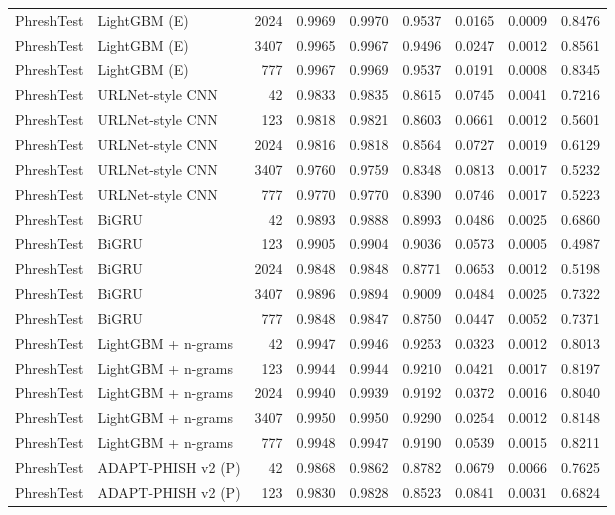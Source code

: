 \begin{table}[t]
\begin{tabular}{llrrrrrrr}
PhreshTest & LightGBM (E) & 2024 & 0.9969 & 0.9970 & 0.9537 & 0.0165 & 0.0009 & 0.8476 \\
PhreshTest & LightGBM (E) & 3407 & 0.9965 & 0.9967 & 0.9496 & 0.0247 & 0.0012 & 0.8561 \\
PhreshTest & LightGBM (E) & 777 & 0.9967 & 0.9969 & 0.9537 & 0.0191 & 0.0008 & 0.8345 \\
PhreshTest & URLNet-style CNN & 42 & 0.9833 & 0.9835 & 0.8615 & 0.0745 & 0.0041 & 0.7216 \\
PhreshTest & URLNet-style CNN & 123 & 0.9818 & 0.9821 & 0.8603 & 0.0661 & 0.0012 & 0.5601 \\
PhreshTest & URLNet-style CNN & 2024 & 0.9816 & 0.9818 & 0.8564 & 0.0727 & 0.0019 & 0.6129 \\
PhreshTest & URLNet-style CNN & 3407 & 0.9760 & 0.9759 & 0.8348 & 0.0813 & 0.0017 & 0.5232 \\
PhreshTest & URLNet-style CNN & 777 & 0.9770 & 0.9770 & 0.8390 & 0.0746 & 0.0017 & 0.5223 \\
PhreshTest & BiGRU & 42 & 0.9893 & 0.9888 & 0.8993 & 0.0486 & 0.0025 & 0.6860 \\
PhreshTest & BiGRU & 123 & 0.9905 & 0.9904 & 0.9036 & 0.0573 & 0.0005 & 0.4987 \\
PhreshTest & BiGRU & 2024 & 0.9848 & 0.9848 & 0.8771 & 0.0653 & 0.0012 & 0.5198 \\
PhreshTest & BiGRU & 3407 & 0.9896 & 0.9894 & 0.9009 & 0.0484 & 0.0025 & 0.7322 \\
PhreshTest & BiGRU & 777 & 0.9848 & 0.9847 & 0.8750 & 0.0447 & 0.0052 & 0.7371 \\
PhreshTest & LightGBM + n-grams & 42 & 0.9947 & 0.9946 & 0.9253 & 0.0323 & 0.0012 & 0.8013 \\
PhreshTest & LightGBM + n-grams & 123 & 0.9944 & 0.9944 & 0.9210 & 0.0421 & 0.0017 & 0.8197 \\
PhreshTest & LightGBM + n-grams & 2024 & 0.9940 & 0.9939 & 0.9192 & 0.0372 & 0.0016 & 0.8040 \\
PhreshTest & LightGBM + n-grams & 3407 & 0.9950 & 0.9950 & 0.9290 & 0.0254 & 0.0012 & 0.8148 \\
PhreshTest & LightGBM + n-grams & 777 & 0.9948 & 0.9947 & 0.9190 & 0.0539 & 0.0015 & 0.8211 \\
PhreshTest & ADAPT-PHISH v2 (P) & 42 & 0.9868 & 0.9862 & 0.8782 & 0.0679 & 0.0066 & 0.7625 \\
PhreshTest & ADAPT-PHISH v2 (P) & 123 & 0.9830 & 0.9828 & 0.8523 & 0.0841 & 0.0031 & 0.6824 \\

\end{tabular}
\end{table}
